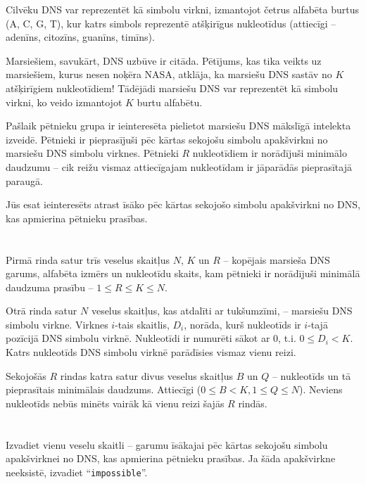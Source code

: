 \ifx\boi\undefined\fi
\def\version{jury-1}
Cilvēku DNS var reprezentēt kā simbolu virkni,
izmantojot četrus alfabēta burtus (A, C, G, T), kur katrs simbols reprezentē
atšķirīgus nukleotīdus (attiecīgi -- adenīns, citozīns, guanīns, timīns).

Marsiešiem, savukārt, DNS uzbūve ir citāda. Pētījums, kas tika veikts
uz marsiešiem, kurus nesen noķēra NASA, atklāja, ka marsiešu DNS sastāv no
$K$ atšķirīgiem nukleotīdiem! Tādējādi marsiešu DNS var reprezentēt kā
simbolu virkni, ko veido izmantojot $K$ burtu alfabētu.

Pašlaik pētnieku grupa ir ieinteresēta pielietot marsiešu DNS
mākslīgā intelekta izveidē. Pētnieki ir pieprasījuši pēc kārtas sekojošu simbolu
apakšvirkni no marsiešu DNS simbolu virknes. Pētnieki $R$ nukleotīdiem ir norādījuši
minimālo daudzumu -- cik reižu vismaz attiecīgajam nukleotīdam ir jāparādās
pieprasītajā paraugā.

Jūs esat ieinteresēts atrast īsāko pēc kārtas sekojošo simbolu apakšvirkni no DNS, kas apmierina pētnieku prasības.

\section*{}
Pirmā rinda satur trīs veselus skaitļus $N$, $K$ un $R$ --
kopējais marsieša DNS garums, alfabēta izmērs un
nukleotīdu skaits, kam pētnieki ir norādījuši minimālā daudzuma
prasību -- $1 \le R \le K \le N$.

Otrā rinda satur $N$ veselus skaitļus, kas atdalīti ar tukšumzīmi, -- marsiešu
DNS simbolu virkne. Virknes $i$-tais skaitlis, $D_i$, norāda, kurš nukleotīds
ir $i$-tajā pozīcijā DNS simbolu virknē. Nukleotīdi ir numurēti sākot ar $0$, t.i.
$0 \leq D_i < K$. Katrs nukleotīds DNS simbolu virknē parādīsies vismaz vienu reizi.

Sekojošās $R$ rindas katra satur divus veselus skaitļus $B$ un $Q$ --
nukleotīds un tā pieprasītais minimālais daudzums. Attiecīgi ($0 \le B < K, 1 \le Q \le N$).
Neviens nukleotīds nebūs minēts vairāk kā vienu reizi šajās $R$ rindās.

\section*{\outputsection}
Izvadiet vienu veselu skaitli -- garumu īsākajai pēc kārtas sekojošu simbolu apakšvirknei
no DNS, kas apmierina pētnieku prasības. Ja šāda apakšvirkne
neeksistē, izvadiet ``\texttt{impossible}''.

